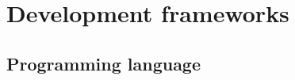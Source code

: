 \documentclass[../ITD.tex]{subfiles}
\begin{document}
    \chapter{Development frameworks}\label{ch: development-frameworks}
    \section{Programming language}\label{sec:programming-laguage}
\end{document}
